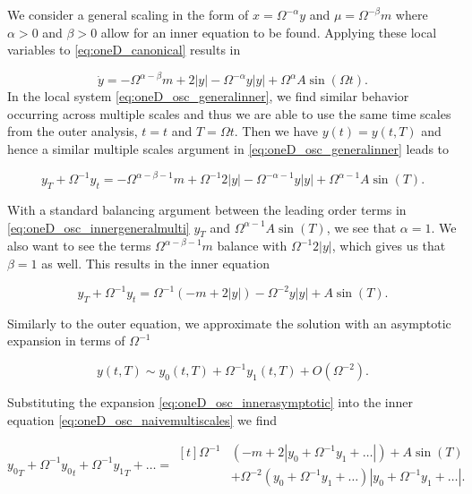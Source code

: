 \indent We consider a general scaling in the form of $x=\Omega^{-\alpha}y$ and $\mu = \Omega^{-\beta}m$ where $\alpha>0$ and $\beta>0$ allow for an inner equation to be found. Applying these local variables to \eqref{eq:oneD_canonical} results in

\begin{equation}\label{eq:oneD_osc_generalinner}
\dot{y} = -\Omega^{\alpha-\beta}m+2|y|-\Omega^{-\alpha}y|y|+\Omega^{\alpha}A\sin(\Omega t).
\end{equation}
In the local system \eqref{eq:oneD_osc_generalinner}, we find similar behavior occurring across multiple scales and thus we are able to use the same time scales from the outer analysis, $t=t$ and $T=\Omega t$. Then we have $y(t)=y(t,T)$ and hence a similar multiple scales argument in \eqref{eq:oneD_osc_generalinner} leads to

\begin{equation}\label{eq:oneD_osc_innergeneralmulti}
y_T+\Omega^{-1}y_t = - \Omega^{\alpha-\beta-1}m+\Omega^{-1}2|y|-\Omega^{-\alpha-1}y|y|+\Omega^{\alpha-1}A\sin(T).
\end{equation}

With a standard balancing argument between the leading order terms in \eqref{eq:oneD_osc_innergeneralmulti} $y_T$ and $\Omega^{\alpha-1} A\sin(T)$, we see that $\alpha=1$. We also want to see the terms $\Omega^{\alpha-\beta-1}m$ balance with $\Omega^{-1}2|y|$, which gives us that $\beta=1$ as well. This results in the inner equation

\begin{equation}\label{eq:oneD_osc_naivemultiscales}
y_T+\Omega^{-1}y_t = \Omega^{-1}\left(-m+2|y|\right)-\Omega^{-2}y|y|+A\sin(T).
\end{equation}

Similarly to the outer equation, we approximate the solution with an asymptotic expansion in terms of $\Omega^{-1}$ 

\begin{equation}\label{eq:oneD_osc_innerasymptotic}
y(t,T)\sim y_0(t,T)+\Omega^{-1}y_1(t,T)+O(\Omega^{-2}).
\end{equation}

Substituting the expansion \eqref{eq:oneD_osc_innerasymptotic} into the inner equation \eqref{eq:oneD_osc_naivemultiscales} we find

\begin{equation*}
{y_0}_T+\Omega^{-1}{y_0}_t+\Omega^{-1}{y_1}_T+\ldots =\begin{aligned}[t]\Omega^{-1}&(-m+2|y_0+\Omega^{-1}y_1+\ldots|)+A\sin(T)\\
&+\Omega^{-2}(y_0+\Omega^{-1}y_1+\ldots)|y_0+\Omega^{-1}y_1+\ldots|.
\end{aligned}
\end{equation*}

